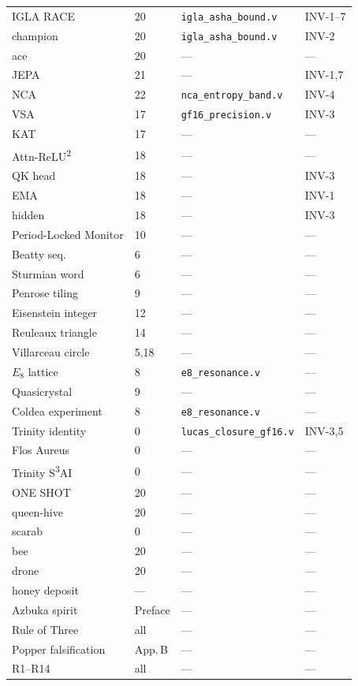 \begin{longtable}{p{3.6cm} p{2.0cm} p{3.5cm} p{1.6cm}}
IGLA RACE & 20 & \texttt{igla\_asha\_bound.v} & INV-1--7 \\
champion & 20 & \texttt{igla\_asha\_bound.v} & INV-2 \\
ace & 20 & --- & --- \\
JEPA & 21 & --- & INV-1,7 \\
NCA & 22 & \texttt{nca\_entropy\_band.v} & INV-4 \\
VSA & 17 & \texttt{gf16\_precision.v} & INV-3 \\
KAT & 17 & --- & --- \\
Attn-ReLU\textsuperscript{2} & 18 & --- & --- \\
QK head & 18 & --- & INV-3 \\
EMA & 18 & --- & INV-1 \\
hidden & 18 & --- & INV-3 \\
Period-Locked Monitor & 10 & --- & --- \\
Beatty seq.\ & 6 & --- & --- \\
Sturmian word & 6 & --- & --- \\
Penrose tiling & 9 & --- & --- \\
Eisenstein integer & 12 & --- & --- \\
Reuleaux triangle & 14 & --- & --- \\
Villarceau circle & 5,18 & --- & --- \\
$E_8$ lattice & 8 & \texttt{e8\_resonance.v} & --- \\
Quasicrystal & 9 & --- & --- \\
Coldea experiment & 8 & \texttt{e8\_resonance.v} & --- \\
Trinity identity & 0 & \texttt{lucas\_closure\_gf16.v} & INV-3,5 \\
Flos Aureus & 0 & --- & --- \\
Trinity S\textsuperscript{3}AI & 0 & --- & --- \\
ONE SHOT & 20 & --- & --- \\
queen-hive & 20 & --- & --- \\
scarab & 0 & --- & --- \\
bee & 20 & --- & --- \\
drone & 20 & --- & --- \\
honey deposit & --- & --- & --- \\
Azbuka spirit & Preface & --- & --- \\
Rule of Three & all & --- & --- \\
Popper falsification & App.\,B & --- & --- \\
R1--R14 & all & --- & --- \\

\end{longtable}

